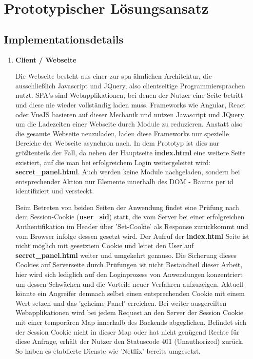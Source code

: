 \chapter{Prototypischer Lösungsansatz}
\section{Implementationsdetails}
\begin{enumerate} 
\item \textbf{Client / Webseite}

Die Webseite besteht aus einer zur \ac{spa} ähnlichen Architektur, die ausschließlich Javascript und JQuery, also clientseitige Programmiersprachen nutzt. SPA's sind Webapplikationen, bei denen der Nutzer eine Seite betritt und diese nie wieder vollständig laden muss. Frameworks wie Angular, React oder VueJS basieren auf dieser Mechanik und nutzen Javascript und JQuery um die Ladezeiten einer Webseite durch Module zu reduzieren. Anstatt also die gesamte Webseite neuzuladen, laden diese Frameworks nur spezielle Bereiche der Webseite asynchron nach. In dem Prototyp ist dies nur größtenteils der Fall, da neben der Hauptseite \textbf{index.html} eine weitere Seite existiert, auf die man bei erfolgreichem Login weitergeleitet wird: \textbf{secret\_panel.html}. Auch werden keine Module nachgeladen, sondern bei entsprechender Aktion nur Elemente innerhalb des DOM - Baums per id identifiziert und versteckt.

Beim Betreten von beiden Seiten der Anwendung findet eine Prüfung nach dem Session-Cookie (\textbf{user\_sid}) statt, die vom Server bei einer erfolgreichen Authentifikation im Header über 'Set-Cookie' als Response zurückkommt und vom Browser infolge dessen gesetzt wird. Der Aufruf der \textbf{index.html} Seite ist nicht möglich mit gesetztem Cookie und leitet den User auf \textbf{secret\_panel.html} weiter und umgekehrt genauso. Die Sicherung dieses Cookies auf Serverseite durch Prüfungen ist nicht Bestandteil dieser Arbeit, hier wird sich lediglich auf den Loginprozess von Anwendungen konzentriert um dessen Schwächen und die Vorteile neuer Verfahren aufzuzeigen. Aktuell könnte ein Angreifer demnach selbst einen entsprechenden Cookie mit einem Wert setzen und das 'geheime Panel' erreichen. Bei weiter ausgereiften Webapplikationen wird bei jedem Request an den Server der Session Cookie mit einer temporären Map innerhalb des Backends abgeglichen. Befindet sich der Session Cookie nicht in dieser Map oder hat nicht genügend Rechte für diese Anfrage, erhält der Nutzer den Statuscode 401 (Unauthorized) zurück. So haben es etablierte Dienste wie 'Netflix' bereits umgesetzt.


\end{enumerate}
